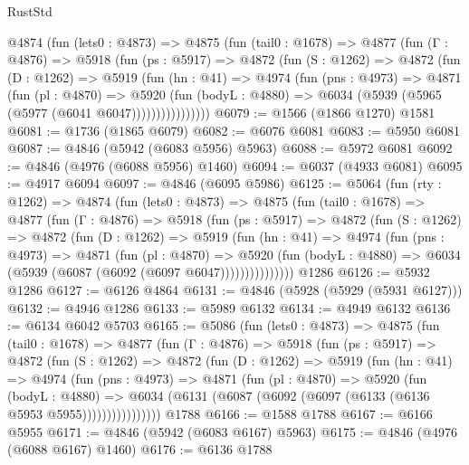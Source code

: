 \begin{lexlean}{RustStd}
\begin{coremodule}
      @4874
        (fun (lets0 : @4873) =>
        @4875
          (fun (tail0 : @1678) =>
          @4877
            (fun (Γ : @4876) =>
            @5918
              (fun (ps : @5917) =>
              @4872
                (fun (S : @1262) =>
                @4872
                  (fun (D : @1262) =>
                  @5919
                    (fun (hn : @41) =>
                    @4974
                      (fun (pns : @4973) =>
                      @4871
                        (fun (pl : @4870) =>
                        @5920
                          (fun (bodyL : @4880) =>
                          @6034 (@5939 (@5965 (@5977 (@6041 @6047))))))))))))))))
@6079 := @1566 (@1866 @1270) @1581
@6081 := @1736 (@1865 @6079)
@6082 := @6076 @6081
@6083 := @5950 @6081
@6087 := @4846 (@5942 (@6083 @5956) @5963)
@6088 := @5972 @6081
@6092 := @4846 (@4976 (@6088 @5956) @1460)
@6094 := @6037 (@4933 @6081)
@6095 := @4917 @6094
@6097 := @4846 (@6095 @5986)
@6125 := @5064
    (fun (rty : @1262) =>
    @4874
      (fun (lets0 : @4873) =>
      @4875
        (fun (tail0 : @1678) =>
        @4877
          (fun (Γ : @4876) =>
          @5918
            (fun (ps : @5917) =>
            @4872
              (fun (S : @1262) =>
              @4872
                (fun (D : @1262) =>
                @5919
                  (fun (hn : @41) =>
                  @4974
                    (fun (pns : @4973) =>
                    @4871
                      (fun (pl : @4870) =>
                      @5920
                        (fun (bodyL : @4880) =>
                        @6034 (@5939 (@6087 (@6092 (@6097 @6047)))))))))))))))
    @1286
@6126 := @5932 @1286
@6127 := @6126 @4864
@6131 := @4846 (@5928 (@5929 (@5931 @6127)))
@6132 := @4946 @1286
@6133 := @5989 @6132
@6134 := @4949 @6132
@6136 := @6134 @6042 @5703
@6165 := @5086
    (fun (lets0 : @4873) =>
    @4875
      (fun (tail0 : @1678) =>
      @4877
        (fun (Γ : @4876) =>
        @5918
          (fun (ps : @5917) =>
          @4872
            (fun (S : @1262) =>
            @4872
              (fun (D : @1262) =>
              @5919
                (fun (hn : @41) =>
                @4974
                  (fun (pns : @4973) =>
                  @4871
                    (fun (pl : @4870) =>
                    @5920
                      (fun (bodyL : @4880) =>
                      @6034 (@6131 (@6087 (@6092 (@6097 (@6133 (@6136 @5953 @5955))))))))))))))))
    @1788
@6166 := @1588 @1788
@6167 := @6166 @5955
@6171 := @4846 (@5942 (@6083 @6167) @5963)
@6175 := @4846 (@4976 (@6088 @6167) @1460)
@6176 := @6136 @1788

\end{coremodule}
\end{lexlean}
